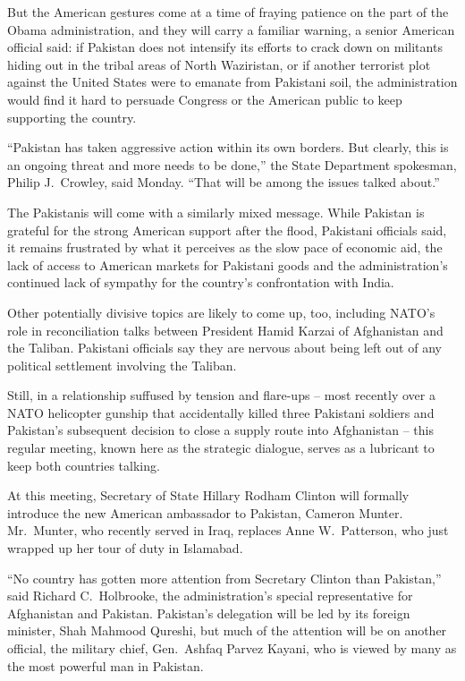 ﻿\documentclass[12pt]{article}
\begin{document}
But the American gestures come at a time of fraying patience on the part of the Obama
administration, and they will carry a familiar warning, a senior American official said: if Pakistan
does not intensify its efforts to crack down on militants hiding out in the tribal areas of North
Waziristan, or if another terrorist plot against the United States were to emanate from Pakistani
soil, the administration would find it hard to persuade Congress or the American public to keep
supporting the country.

``Pakistan has taken aggressive action within its own borders. But clearly, this is an ongoing
threat and more needs to be done,'' the State Department spokesman, Philip J.~Crowley, said Monday.
``That will be among the issues talked about.''

The Pakistanis will come with a similarly mixed message. While Pakistan is grateful for the strong
American support after the flood, Pakistani officials said, it remains frustrated by what it
perceives as the slow pace of economic aid, the lack of access to American markets for Pakistani
goods and the administration's continued lack of sympathy for the country's confrontation with
India.

Other potentially divisive topics are likely to come up, too, including NATO's role in
reconciliation talks between President Hamid Karzai of Afghanistan and the Taliban. Pakistani
officials say they are nervous about being left out of any political settlement involving the
Taliban.

Still, in a relationship suffused by tension and flare-ups -- most recently over a NATO helicopter
gunship that accidentally killed three Pakistani soldiers and Pakistan's subsequent decision to
close a supply route into Afghanistan -- this regular meeting, known here as the strategic dialogue,
serves as a lubricant to keep both countries talking.

At this meeting, Secretary of State Hillary Rodham Clinton will formally introduce the new American
ambassador to Pakistan, Cameron Munter. Mr.~Munter, who recently served in Iraq, replaces Anne
W.~Patterson, who just wrapped up her tour of duty in Islamabad.

``No country has gotten more attention from Secretary Clinton than Pakistan,'' said Richard
C.~Holbrooke, the administration's special representative for Afghanistan and Pakistan. Pakistan's
delegation will be led by its foreign minister, Shah Mahmood Qureshi, but much of the attention will
be on another official, the military chief, Gen.~Ashfaq Parvez Kayani, who is viewed by many as the
most powerful man in Pakistan.
\end{document}
